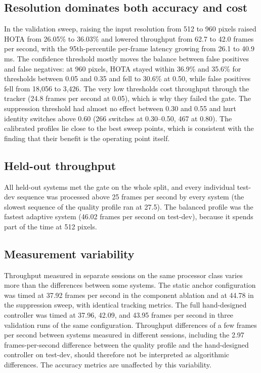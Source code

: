 

\subsection{Resolution dominates both accuracy and cost}
In the validation sweep, raising the input resolution from 512 to 960 pixels raised HOTA from 26.05\% to 36.03\% and lowered throughput from 62.7 to 42.0 frames per second, with the 95th-percentile per-frame latency growing from 26.1 to 40.9 ms. The confidence threshold mostly moves the balance between false positives and false negatives: at 960 pixels, HOTA stayed within 36.9\% and 35.6\% for thresholds between 0.05 and 0.35 and fell to 30.6\% at 0.50, while false positives fell from 18,056 to 3,426. The very low thresholds cost throughput through the tracker (24.8 frames per second at 0.05), which is why they failed the gate. The suppression threshold had almost no effect between 0.30 and 0.55 and hurt identity switches above 0.60 (266 switches at 0.30--0.50, 467 at 0.80). The calibrated profiles lie close to the best sweep points, which is consistent with the finding that their benefit is the operating point itself.

\subsection{Held-out throughput}
All held-out systems met the gate on the whole split, and every individual test-dev sequence was processed above 25 frames per second by every system (the slowest sequence of the quality profile ran at 27.5). The balanced profile was the fastest adaptive system (46.02 frames per second on test-dev), because it spends part of the time at 512 pixels.

\subsection{Measurement variability}
Throughput measured in separate sessions on the same processor class varies more than the differences between some systems. The static anchor configuration was timed at 37.92 frames per second in the component ablation and at 44.78 in the suppression sweep, with identical tracking metrics. The full hand-designed controller was timed at 37.96, 42.09, and 43.95 frames per second in three validation runs of the same configuration. Throughput differences of a few frames per second between systems measured in different sessions, including the 2.97 frames-per-second difference between the quality profile and the hand-designed controller on test-dev, should therefore not be interpreted as algorithmic differences. The accuracy metrics are unaffected by this variability.

